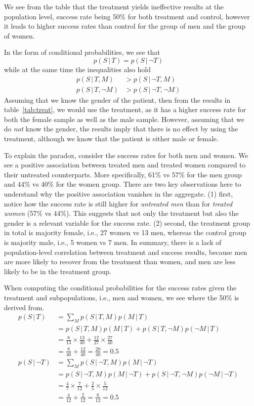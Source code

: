 \documentclass{article}
\newcommand{\giv}{\,|\,}
\begin{document}
\noindent We see from the table that the treatment yields ineffective results at the population level, success rate being 50\% for both treatment and control, however it leads to higher success rates than control for the group of men and the group of women. 

In the form of conditional probabilities, we see that
$$
    p(S \giv T) = p(S \giv \neg T)
$$
while at the same time the inequalities also hold
\begin{align*}
    p(S \giv T, M) &> p(S \giv \neg T, M) \\
    p(S \giv T, \neg M) &> p(S \giv \neg T, \neg M)
\end{align*}
\noindent Assuming that we know the gender of the patient, then from the results in table~\ref{tab:treat}, we would use the treatment, as it has a higher success rate for both the female sample as well as the male sample. However, assuming that we do \textit{not} know the gender, the results imply that there is no effect by using the treatment, although we know that the patient is either male or female. 

To explain the paradox, consider the success rates for both men and women. We see a positive association between treated men and treated women compared to their untreated counterparts. More specifically, 61\% vs 57\% for the men group and 44\% vs 40\% for the women group. There are two key observations here to understand why the positive association vanishes in the aggregate. (1) first, notice how the success rate is still higher for \textit{untreated men} than for \textit{treated women} (57\% vs 44\%). This suggests that not only the treatment but also the gender is a relevant variable for the success rate. (2) second, the treatment group in total is majority female, i.e., 27 women vs 13 men, whereas the control group is majority male, i.e., 5 women vs 7 men. In summary, there is a lack of population-level correlation between treatment and success results, because men are more likely to recover from the treatment than women, and men are less likely to be in the treatment group.

When computing the conditional probabilities for the success rates given the treatment and subpopulations, i.e., men and women, we see where the 50\% is derived from.
\begin{align*}
    p(S \giv T) &= \sum_M p(S \giv T, M) p(M \giv T) \\
    &= p(S \giv T, M) p(M \giv T) + p(S \giv T, \neg M) p(\neg M \giv T) \\
    &= \frac{8}{13} \times \frac{13}{40} + \frac{12}{27} \times \frac{27}{40} \\ 
    &= \frac{8}{40} + \frac{12}{40} = \frac{20}{40} = 0.5\\[2em]
    p(S \giv \neg T) &= \sum_M p(S \giv \neg T, M) p(M \giv \neg T) \\
    &= p(S \giv \neg T, M) p(M \giv \neg T) + p(S \giv \neg T, \neg M) p(\neg M \giv \neg T) \\
    &= \frac{4}{7} \times \frac{7}{12} + \frac{2}{5} \times \frac{5}{12}\\
    &= \frac{4}{12} + \frac{2}{12} = \frac{6}{12} = 0.5
\end{align*}
\end{document}
